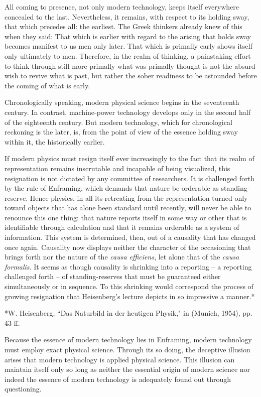 All coming to presence, not only modern technology, keeps itself everywhere concealed to the last. Nevertheless, it remains, with respect to its holding sway, that which precedes all: the earliest. The Greek thinkers already knew of this when they said: That which is earlier with regard to the arising that holds sway becomes manifest to us men only later. That which is primally early shows itself only ultimately to men. Therefore, in the realm of thinking, a painstaking effort to think through still more primally what was primally thought is not the absurd wish to revive what is past, but rather the sober readiness to be astounded before the coming of what is early.

Chronologically speaking, modern physical science begins in the seventeenth century. In contrast, machine-power technology develops only in the second half of the eighteenth century. But modern technology, which for chronological reckoning is the later, is, from the point of view of the essence holding sway within it, the historically earlier.

If modern physics must resign itself ever increasingly to the fact that its realm of representation remains inscrutable and incapable of being visualized, this resignation is not dictated by any committee of researchers. It is challenged forth by the rule of Enframing, which demands that nature be orderable as standing-reserve. Hence physics, in all its retreating from the representation turned only toward objects that has alone been standard until recently, will never be able to renounce this one thing: that nature reports itself in some way or other that is identifiable through calculation and that it remains orderable as a system of information. This system is determined, then, out of a causality that has changed once again. Causality now displays neither the character of the occasioning that brings forth nor the nature of the \textit{causa efficiens}, let alone that of the \textit{causa formalis}. It seems as though causality is shrinking into a reporting -- a reporting challenged forth -- of standing-reserves that must be guaranteed either simultaneously or in sequence. To this shrinking would correspond the process of growing resignation that Heisenberg's lecture depicts in so impressive a manner.*

*W. Heisenberg, ``Das Naturbild in der heutigen Physik," in  (Munich, 1954), pp. 43 ff.

Because the essence of modern technology lies in Enframing, modern technology must employ exact physical science. Through its so doing, the deceptive illusion arises that modern technology is applied physical science. This illusion can maintain itself only so long as neither the essential origin of modern science nor indeed the essence of modern technology is adequately found out through questioning.

